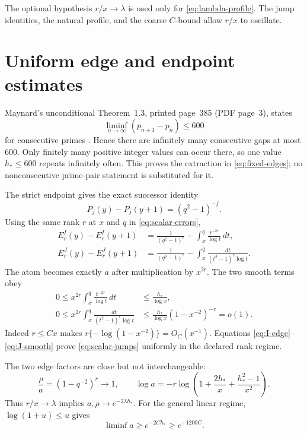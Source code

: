 \documentclass[11pt]{article}
\theoremstyle{definition}
\theoremstyle{remark}
\newcommand{\EI}{E^{I}}
\newcommand{\EJ}{E^{J}}
\begin{document}
The optional hypothesis $r/x\to\lambda$ is used only for
\eqref{eq:lambda-profile}.  The jump identities, the natural profile,
and the coarse $C$-bound allow $r/x$ to oscillate.

\section{Uniform edge and endpoint estimates}

Maynard's unconditional Theorem~1.3, printed page~385 (PDF page~3), states
\begin{equation}
 \liminf_{n\to\infty}(p_{n+1}-p_n)\le600
 \label{eq:Maynard}
\end{equation}
for consecutive primes \cite{Maynard2015}.  Hence there are infinitely
many consecutive gaps at most $600$.  Only finitely many positive
integer values can occur there, so one value $h_*\le600$ repeats
infinitely often.  This proves the extraction in \eqref{eq:fixed-edges};
no nonconsecutive prime-pair statement is substituted for it.

The strict endpoint gives the exact successor identity
\begin{equation}
 P_j(y)-P_j(y+1)=(q^2-1)^{-j}.
 \label{eq:successor}
\end{equation}
Using the same rank $r$ at $x$ and $q$ in \eqref{eq:scalar-errors},
\begin{align}
 \EI_r(y)-\EI_r(y+1)
 &=\frac1{(q^2-1)^r}-\int_x^q\frac{t^{-2r}}{\log t}\,dt,
 \label{eq:I-edge}\\
 \EJ_r(y)-\EJ_r(y+1)
 &=\frac1{(q^2-1)^r}-\int_x^q
       \frac{dt}{(t^2-1)^r\log t}.
 \label{eq:J-edge}
\end{align}
The atom becomes exactly $a$ after multiplication by $x^{2r}$.  The
two smooth terms obey
\begin{align}
 0\le x^{2r}\int_x^q\frac{t^{-2r}}{\log t}\,dt
 &\le\frac{h_*}{\log x},
 \label{eq:I-smooth}\\
 0\le x^{2r}\int_x^q\frac{dt}{(t^2-1)^r\log t}
 &\le\frac{h_*}{\log x}(1-x^{-2})^{-r}=o(1).
 \label{eq:J-smooth}
\end{align}
Indeed $r\le Cx$ makes
$r\{-\log(1-x^{-2})\}=O_C(x^{-1})$.  Equations
\eqref{eq:I-edge}--\eqref{eq:J-smooth} prove
\eqref{eq:scalar-jumps} uniformly in the declared rank regime.

The two edge factors are close but not interchangeable:
\begin{equation}
 \frac{\rho}{a}=(1-q^{-2})^r\longrightarrow1,
 \qquad
 \log a=-r\log\left(1+\frac{2h_*}{x}
                       +\frac{h_*^2-1}{x^2}\right).
 \label{eq:edge-factor-identities}
\end{equation}
Thus $r/x\to\lambda$ implies $a,\rho\to e^{-2\lambda h_*}$.
For the general linear regime, $\log(1+u)\le u$ gives
\begin{equation}
 \liminf a\ge e^{-2Ch_*}\ge e^{-1200C}.
 \label{eq:coarse-a}
\end{equation}
\end{document}
